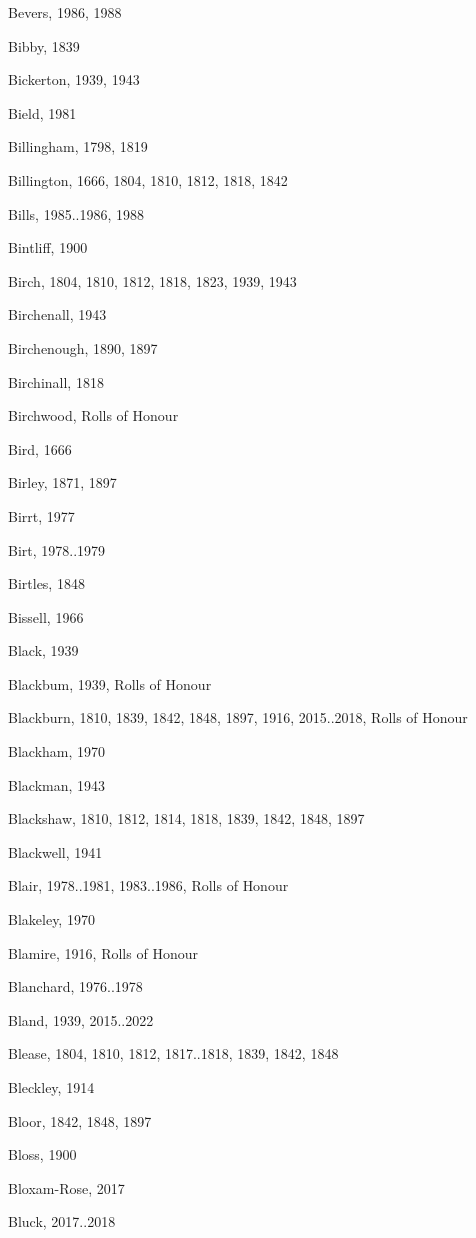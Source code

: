 \begin{theindex}
\item Bevers, 1986, 1988
\item Bibby, 1839
\item Bickerton, 1939, 1943
\item Bield, 1981
\item Billingham, 1798, 1819
\item Billington, 1666, 1804, 1810, 1812, 1818, 1842
\item Bills, 1985..1986, 1988
\item Bintliff, 1900
\item Birch, 1804, 1810, 1812, 1818, 1823, 1939, 1943
\item Birchenall, 1943
\item Birchenough, 1890, 1897
\item Birchinall, 1818
\item Birchwood, Rolls of Honour
\item Bird, 1666
\item Birley, 1871, 1897
\item Birrt, 1977
\item Birt, 1978..1979
\item Birtles, 1848
\item Bissell, 1966
\item Black, 1939
\item Blackbum, 1939, Rolls of Honour
\item Blackburn, 1810, 1839, 1842, 1848, 1897, 1916, 2015..2018, Rolls of Honour
\item Blackham, 1970
\item Blackman, 1943
\item Blackshaw, 1810, 1812, 1814, 1818, 1839, 1842, 1848, 1897
\item Blackwell, 1941
\item Blair, 1978..1981, 1983..1986, Rolls of Honour
\item Blakeley, 1970
\item Blamire, 1916, Rolls of Honour
\item Blanchard, 1976..1978
\item Bland, 1939, 2015..2022
\item Blease, 1804, 1810, 1812, 1817..1818, 1839, 1842, 1848
\item Bleckley, 1914
\item Bloor, 1842, 1848, 1897
\item Bloss, 1900
\item Bloxam-Rose, 2017
\item Bluck, 2017..2018

\end{theindex}
